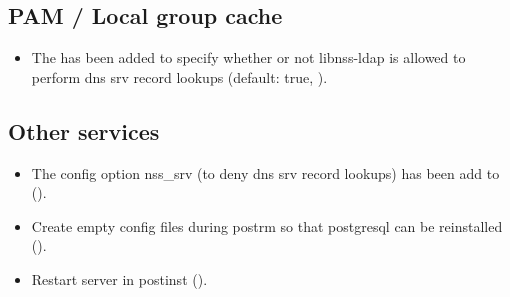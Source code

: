 



\subsection{PAM / Local group cache}
\begin{itemize}
\item The  has been added to specify whether or
not libnss-ldap is allowed to perform dns srv record lookups (default:
true, ).
\end{itemize}

\subsection{Other services}
\begin{itemize}
\item The config option nss\_srv (to deny dns srv record lookups) has
been add to  ().
\item Create empty  config files during postrm so that postgresql can be reinstalled ().
\item Restart  server in postinst ().
\end{itemize}


